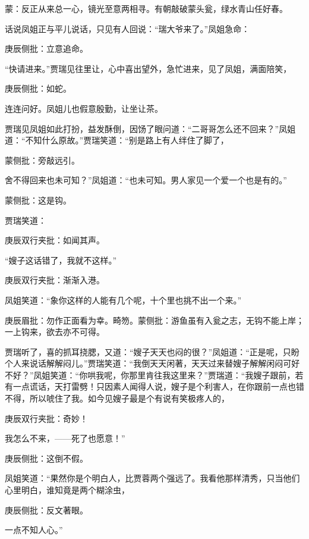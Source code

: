 
\begin{parag}
    \begin{note}蒙：反正从来总一心，镜光至意两相寻。有朝敲破蒙头瓮，绿水青山任好春。\end{note}
\end{parag}


\begin{parag}
    话说凤姐正与平儿说话，只见有人回说：“瑞大爷来了。”凤姐急命：\begin{note}庚辰侧批：立意追命。\end{note}“快请进来。”贾瑞见往里让，心中喜出望外，急忙进来，见了凤姐，满面陪笑，\begin{note}庚辰侧批：如蛇。\end{note}连连问好。凤姐儿也假意殷勤，让坐让茶。
\end{parag}


\begin{parag}
    贾瑞见凤姐如此打扮，益发酥倒，因饧了眼问道：“二哥哥怎么还不回来？”凤姐道：“不知什么原故。”贾瑞笑道：“别是路上有人绊住了脚了，\begin{note}蒙侧批：旁敲远引。\end{note}舍不得回来也未可知？”凤姐道：“也未可知。男人家见一个爱一个也是有的。”\begin{note}蒙侧批：这是钩。\end{note}贾瑞笑道：\begin{note}庚辰双行夹批：如闻其声。\end{note}“嫂子这话错了，我就不这样。”\begin{note}庚辰双行夹批：渐渐入港。\end{note}凤姐笑道：“象你这样的人能有几个呢，十个里也挑不出一个来。”\begin{note}庚辰眉批：勿作正面看为幸。畸笏。蒙侧批：游鱼虽有入瓮之志，无钩不能上岸；一上钩来，欲去亦不可得。\end{note}贾瑞听了，喜的抓耳挠腮，又道：“嫂子天天也闷的很？”凤姐道：“正是呢，只盼个人来说话解解闷儿。”贾瑞笑道：“我倒天天闲著，天天过来替嫂子解解闲闷可好不好？”凤姐笑道：“你哄我呢，你那里肯往我这里来？”贾瑞道：“我嫂子跟前，若有一点谎话，天打雷劈！只因素人闻得人说，嫂子是个利害人，在你跟前一点也错不得，所以唬住了我。如今见嫂子最是个有说有笑极疼人的，\begin{note}庚辰双行夹批：奇妙！\end{note}我怎么不来，——死了也愿意！”\begin{note}庚辰侧批：这倒不假。\end{note}凤姐笑道：“果然你是个明白人，比贾蓉两个强远了。我看他那样清秀，只当他们心里明白，谁知竟是两个糊涂虫，\begin{note}庚辰侧批：反文著眼。\end{note}一点不知人心。”
\end{parag}



